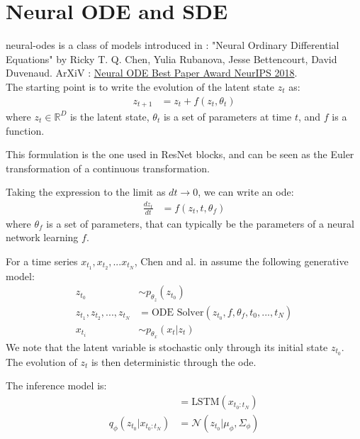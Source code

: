 \chapter{Neural ODE and SDE}\label{sec:Neural Ordinary Differential Equation}

\glspl{neural-ode} is a class of models introduced in \cite{chen_neural_2019} : "Neural Ordinary Differential Equations" 
by Ricky T. Q. Chen, Yulia Rubanova, Jesse Bettencourt, David Duvenaud. 
ArXiV : \href{https://arxiv.org/abs/1806.07366}{Neural ODE Best Paper Award NeurIPS 2018}.\\

The starting point is to write the evolution of the latent state $z_t$ as:
\begin{align}
    z_{t+1} &= z_t + f(z_t, \theta_t)
\end{align}
where $z_t \in \mathbb{R}^D$ is the latent state, $\theta_t$ is a set
 of parameters at time $t$, and $f$ is a function.

This formulation is the one used in ResNet blocks, and can be 
seen as the Euler transformation of a continuous transformation.

Taking the expression to the limit as $dt \rightarrow 0$, we can write an 
\gls{ode}:
\begin{align}
    \frac{dz_t}{dt} &= f(z_t, t, \theta_f)
\end{align}
where $\theta_f$ is a set of parameters, that can typically be the parameters of 
a neural network learning $f$.

For a time series $x_{t_1}, x_{t_2}, ... x_{t_N}$, Chen and al. in \cite{chen_neural_2019} 
assume the following generative model:
\begin{align}
    z_{t_0} &\sim p_{\theta_z}(z_{t_0}) \\
    z_{t_1}, z_{t_2}, ..., z_{t_N} &= \text{ODE Solver}(z_{t_0}, f, \theta_f, t_0, ..., t_N ) \\
    x_{t_i} &\sim p_{\theta_x}(x_t \vert z_t)
\end{align}
We note that the latent variable is stochastic only through its initial state $z_{t_0}$. 
The evolution of $z_t$ is then deterministic through the \gls{ode}.

The inference model is:
\begin{align}
    [\mu_\phi, \Sigma_\phi] &= \text{LSTM} (x_{t_0:t_N})   \\
    q_{\phi}(z_{t_0} \vert x_{t_0:t_N}) &= \mathcal{N}(z_{t_0} \vert \mu_{\phi}, \Sigma_\phi)
\end{align}

